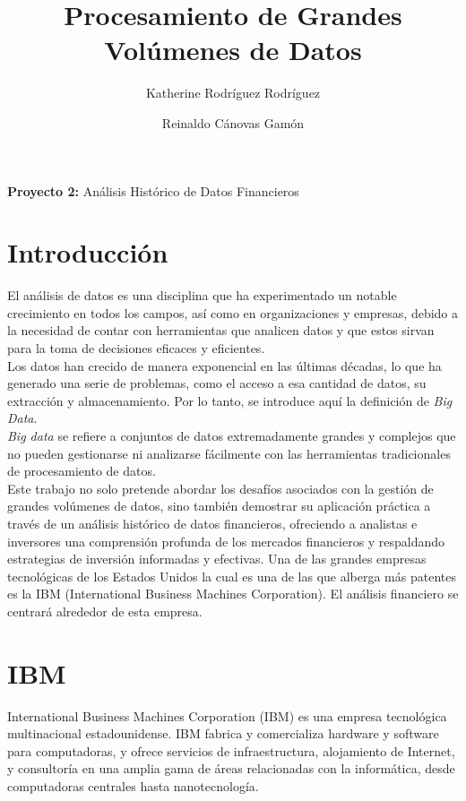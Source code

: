 \documentclass{article}
\begin{document}
	\title{\textbf{Procesamiento de Grandes Volúmenes de Datos}}
	\author{Katherine Rodríguez Rodríguez \and Reinaldo Cánovas Gamón}
	\date{} 
	
	\maketitle
	
	\begin{center}
		\textbf{Proyecto 2:} Análisis Histórico de Datos Financieros\\
       
	\tableofcontents
     \end{center}
    \section{Introducción}

    \begin{flushleft}
    	El análisis de datos es una disciplina que ha experimentado un notable crecimiento en todos los campos, así como en organizaciones y empresas, debido a la necesidad de contar con herramientas que analicen datos y que estos sirvan para la toma de decisiones eficaces y eficientes.  \\
    	Los datos han crecido de manera exponencial en las últimas décadas, lo que ha generado una serie de problemas, como el acceso a esa cantidad de datos, su extracción y almacenamiento. Por lo tanto, se introduce aquí la definición de \textit{Big Data}. \\
    \textit{Big data} se refiere a conjuntos de datos extremadamente grandes y complejos que no pueden gestionarse ni analizarse fácilmente con las herramientas tradicionales de procesamiento de datos.  \\
    	Este trabajo no solo pretende abordar los desafíos asociados con la gestión de grandes volúmenes de datos, sino también demostrar su aplicación práctica a través de un análisis histórico de datos financieros, ofreciendo a analistas e inversores una comprensión profunda de los mercados financieros y respaldando estrategias de inversión informadas y efectivas. Una de las grandes empresas tecnológicas de los Estados Unidos la cual es una de las que alberga más patentes es la IBM (International Business Machines Corporation). El análisis financiero se centrará alrededor de esta empresa.
    \end{flushleft}
    \section{IBM}
    International Business Machines Corporation (IBM) es una empresa tecnológica multinacional estadounidense. IBM fabrica y comercializa hardware y software para computadoras, y ofrece servicios de infraestructura, alojamiento de Internet, y consultoría en una amplia gama de áreas relacionadas con la informática, desde computadoras centrales hasta nanotecnología.
\end{document}
